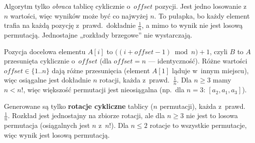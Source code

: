 \documentclass[11pt]{article}
\begin{document}
\begin{intuicja}
Algorytm tylko \emph{obraca} tablicę cyklicznie o~$\mathit{offset}$ pozycji.
Jest jedno losowanie z~$n$ wartości, więc wyników może być co najwyżej $n$.
To pułapka, bo każdy element trafia na każdą pozycję z~prawd.\ dokładnie
$\frac1n$, a mimo to wynik nie jest losową permutacją.
Jednostajne „rozkłady brzegowe” nie wystarczają.
\end{intuicja}
\formalnie
Pozycja docelowa elementu $A[i]$ to $\bigl((i+\mathit{offset}-1)\bmod n\bigr)+1$,
czyli $B$ to $A$ przesunięta cyklicznie o~$\mathit{offset}$ (dla
$\mathit{offset}=n$ --- identyczność). Różne wartości $\mathit{offset}\in\{1..n\}$
dają różne przesunięcia (element $A[1]$ ląduje w~innym miejscu), więc
osiągalne jest dokładnie $n$ rotacji, każda z~prawd.\ $\frac1n$.
Dla $n\ge3$ mamy $n<n!$, więc większość permutacji jest nieosiągalna
(np.\ dla $n=3$: $[a_2,a_1,a_3]$).
\begin{odpowiedz}
Generowane są tylko \textbf{rotacje cykliczne} tablicy ($n$ permutacji),
każda z~prawd.\ $\frac1n$. Rozkład jest jednostajny na zbiorze rotacji, ale
dla $n\ge3$ nie jest to losowa permutacja (osiągalnych jest $n$ z~$n!$). Dla $n\le2$
rotacje to wszystkie permutacje, więc wynik jest losową permutacją.
\end{odpowiedz}
\end{document}
